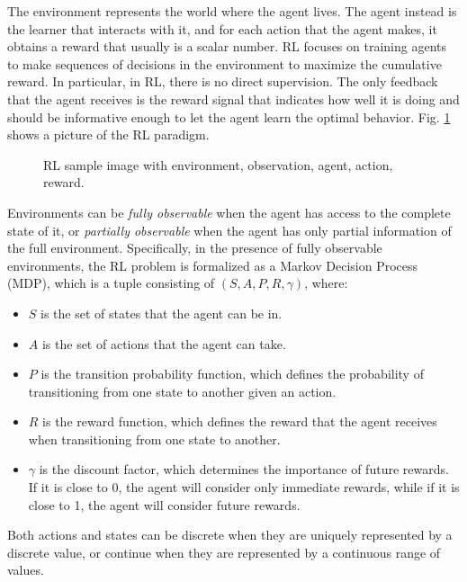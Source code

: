 The environment represents the world where the agent lives.
The agent instead is the learner that interacts with it, and for each action that the agent makes, it obtains a reward that usually is a scalar number.
RL focuses on training agents to make sequences of decisions in the environment to maximize the cumulative reward.
In particular, in RL, there is no direct supervision.
The only feedback that the agent receives is the reward signal that indicates how well it is doing and should be informative enough to let the agent learn the optimal behavior.
Fig. \ref{fig:rl} shows a picture of the RL paradigm.


\begin{figure}[ht]
    \begin{center}
        \fbox{\rule[-.5cm]{0cm}{4cm} \rule[-.5cm]{4cm}{0cm}}
    \end{center}
    \caption{RL sample image with environment, observation, agent, action, reward.}
    \label{fig:rl}
\end{figure}


Environments can be \textit{fully observable} when the agent has access to the complete state of it, or \textit{partially observable} when the agent has only partial information of the full environment.
Specifically, in the presence of fully observable environments, the RL problem is formalized as a Markov Decision Process (MDP), which is a tuple consisting of $(S, A, P, R, \gamma)$, where:
\begin{itemize}
    \item $S$ is the set of states that the agent can be in.
    \item $A$ is the set of actions that the agent can take.
    \item $P$ is the transition probability function, which defines the probability of transitioning from one state to another given an action.
    \item $R$ is the reward function, which defines the reward that the agent receives when transitioning from one state to another.
    \item $\gamma$ is the discount factor, which determines the importance of future rewards.
    If it is close to 0, the agent will consider only immediate rewards, while if it is close to 1, the agent will consider future rewards.
\end{itemize}

Both actions and states can be discrete when they are uniquely represented by a discrete value, or continue when they are represented by a continuous range of values.

